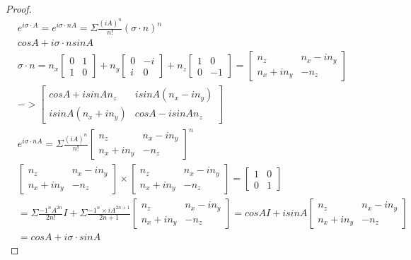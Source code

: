 \documentclass{article}
\begin{document}
\begin{proof}
  \begin{align*}
    &e^{i\sigma\cdot A}=e^{i\sigma\cdot nA}=\Sigma\frac{(iA)^n}{n!}(\sigma\cdot n)^n\\
    &cosA+i\sigma\cdot nsinA\\
    &\sigma\cdot n=
    n_x\begin{bmatrix}
      0&1\\1&0
      \end{bmatrix}+n_y
      \begin{bmatrix}
        0&-i\\
        i&0
      \end{bmatrix}+n_z
      \begin{bmatrix}
        1&0\\0&-1
      \end{bmatrix}=
      \begin{bmatrix}
        n_z&n_x-in_y\\
        n_x+in_y&-n_z
      \end{bmatrix}\\
    &->\begin{bmatrix}
      cosA+isinAn_z&isinA(n_x-in_y)\\
      isinA(n_x+in_y)&cosA-isinAn_z
    \end{bmatrix}\\
    &e^{i\sigma\cdot nA}=\Sigma\frac{(iA)^n}{n!}\begin{bmatrix}
      n_z&n_x-in_y\\
      n_x+in_y&-n_z
    \end{bmatrix}^n\\
    &\begin{bmatrix}
      n_z&n_x-in_y\\
      n_x+in_y&-n_z
    \end{bmatrix}\times\begin{bmatrix}
      n_z&n_x-in_y\\
      n_x+in_y&-n_z
    \end{bmatrix}=\begin{bmatrix}
      1&0\\
      0&1
      \end{bmatrix}\\&=\Sigma\frac{-1^{n}A^{2n}}{2n!}I+\Sigma\frac{-1^n\times iA^{2n+1}}{2n+1}\begin{bmatrix}
      n_z&n_x-in_y\\
      n_x+in_y&-n_z
    \end{bmatrix}=cosAI+isinA\begin{bmatrix}
      n_z&n_x-in_y\\
      n_x+in_y&-n_z
    \end{bmatrix}\\
    &=cosA+i\sigma\cdot sinA
  \end{align*}
\end{proof}
\end{document}

